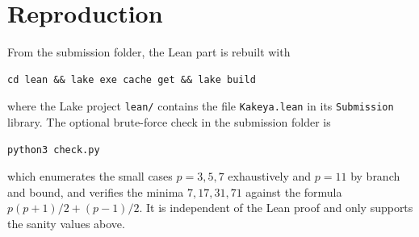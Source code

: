 \documentclass[11pt,a4paper]{article}
\theoremstyle{definition}
\theoremstyle{remark}
\begin{document}
\section{Reproduction}

From the submission folder, the Lean part is rebuilt with
\begin{lstlisting}
cd lean && lake exe cache get && lake build
\end{lstlisting}
where the Lake project \texttt{lean/} contains the file \texttt{Kakeya.lean} in its \texttt{Submission}
library. The optional brute-force check in the submission folder is
\begin{lstlisting}
python3 check.py
\end{lstlisting}
which enumerates the small cases $p=3,5,7$ exhaustively and $p=11$ by branch and bound, and verifies
the minima $7,17,31,71$ against the formula $p(p+1)/2+(p-1)/2$. It is independent of the Lean proof and
only supports the sanity values above.
\end{document}
